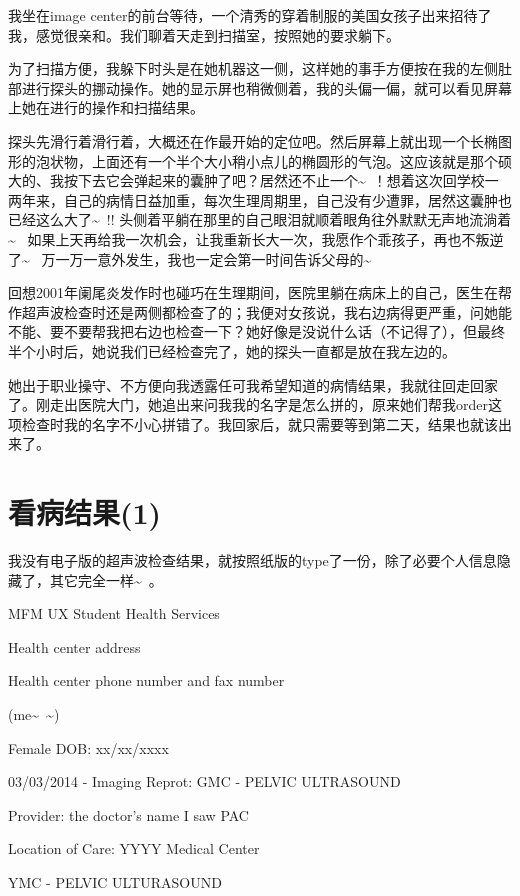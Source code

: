 \documentclass[12pt]{book}
\begin{document}
我坐在image center的前台等待，一个清秀的穿着制服的美国女孩子出来招待了我，感觉很亲和。我们聊着天走到扫描室，按照她的要求躺下。

为了扫描方便，我躲下时头是在她机器这一侧，这样她的事手方便按在我的左侧肚部进行探头的挪动操作。她的显示屏也稍微侧着，我的头偏一偏，就可以看见屏幕上她在进行的操作和扫描结果。

探头先滑行着滑行着，大概还在作最开始的定位吧。然后屏幕上就出现一个长椭图形的泡状物，上面还有一个半个大小稍小点儿的椭圆形的气泡。这应该就是那个硕大的、我按下去它会弹起来的囊肿了吧？居然还不止一个\textasciitilde{}~！想着这次回学校一两年来，自己的病情日益加重，每次生理周期里，自己没有少遭罪，居然这囊肿也已经这么大了\textasciitilde{}~!! 头侧着平躺在那里的自己眼泪就顺着眼角往外默默无声地流淌着\textasciitilde{}~ 如果上天再给我一次机会，让我重新长大一次，我愿作个乖孩子，再也不叛逆了\textasciitilde{}~ 万一万一意外发生，我也一定会第一时间告诉父母的\textasciitilde{}~

回想2001年阑尾炎发作时也碰巧在生理期间，医院里躺在病床上的自己，医生在帮作超声波检查时还是两侧都检查了的；我便对女孩说，我右边病得更严重，问她能不能、要不要帮我把右边也检查一下？她好像是没说什么话（不记得了），但最终半个小时后，她说我们已经检查完了，她的探头一直都是放在我左边的。

她出于职业操守、不方便向我透露任可我希望知道的病情结果，我就往回走回家了。刚走出医院大门，她追出来问我我的名字是怎么拼的，原来她们帮我order这项检查时我的名字不小心拼错了。我回家后，就只需要等到第二天，结果也就该出来了。

\section{看病结果(1)}
\label{sec-30-4}

我没有电子版的超声波检查结果，就按照纸版的type了一份，除了必要个人信息隐藏了，其它完全一样\textasciitilde{}~。

MFM UX Student Health Services

Health center address

Health center phone number and fax number

(me\textasciitilde{}~\textasciitilde{})

Female DOB: xx/xx/xxxx

03/03/2014 - Imaging Reprot: GMC - PELVIC ULTRASOUND

Provider: the doctor's name I saw PAC

Location of Care: YYYY Medical Center

YMC - PELVIC ULTURASOUND
\end{document}
